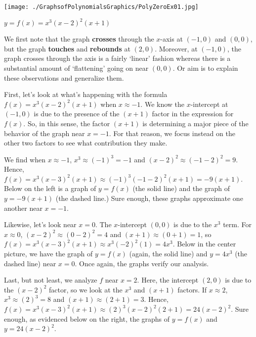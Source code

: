 \documentclass{ximera}
\begin{document}
\begin{center}

\texttt{[image: ./GraphsofPolynomialsGraphics/PolyZeroEx01.jpg]} 

$y = f(x) = x^3 (x-2)^2 (x+1)$

\end{center}


We first note that the graph \textbf{crosses} through the $x$-axis at $(-1,0)$ and $(0,0)$, but the graph \textbf{touches} and \textbf{rebounds} at $(2,0)$.  Moreover, at $(-1,0)$, the graph crosses through the axis is a fairly `linear' fashion whereas there is a substantial amount of `flattening' going on near $(0,0)$.  Or aim is to explain these observations and generalize them.


First, let's look at what's happening with the formula  $f(x) =  x^3 (x-2)^2 (x+1)$  when  $x  \approx  -1$.   We know the $x$-intercept at $(-1,0)$ is due to the presence of the $(x+1)$ factor in the expression for $f(x)$.  So, in this sense, the factor $(x+1)$ is determining a major piece of the behavior of the graph near $x = -1$.   For that reason, we focus instead on the other two factors to see what contribution they make. 


We find when $x \approx -1$,  $x^3  \approx  (-1)^3 = -1$ and $(x-2)^2 \approx (-1-2)^2 = 9$.  Hence, $f(x) = x^3 (x-3)^2 (x+1) \approx (-1)^3 (-1-2)^2 (x+1) = -9(x+1)$.  Below on the left is a graph of $y = f(x)$ (the solid line) and the graph of $y = -9(x+1)$ (the dashed line.)  Sure enough, these graphs approximate one another near $x = -1$. 


Likewise, let's look near $x = 0$.  The $x$-intercept $(0,0)$ is due to the $x^3$ term.  For $x \approx 0$, $(x-2)^2 \approx (0-2)^2 = 4$ and $(x+1) \approx (0+1) = 1$, so $f(x) =  x^3 (x-3)^2 (x+1) \approx x^3 (-2)^2(1) = 4x^3$.  Below in the center picture, we have the graph of $y = f(x)$ (again, the solid line) and $y = 4x^3$ (the dashed line) near $x=0$.  Once again, the graphs verify our analysis.


Last, but not least, we analyze $f$ near $x = 2$.  Here, the intercept $(2,0)$ is due to the $(x-2)^2$ factor, so we look at the $x^3$ and $(x+1)$ factors.  If $x \approx 2$, $x^3 \approx (2)^3 = 8$ and $(x+1) \approx (2+1) = 3$.  Hence,  $f(x) =  x^3 (x-3)^2 (x+1) \approx (2)^3 (x-2)^2 (2+1) = 24(x-2)^2$.  Sure enough, as evidenced below on the right, the graphs of $y = f(x)$ and $y = 24(x-2)^2$.
\end{document}
